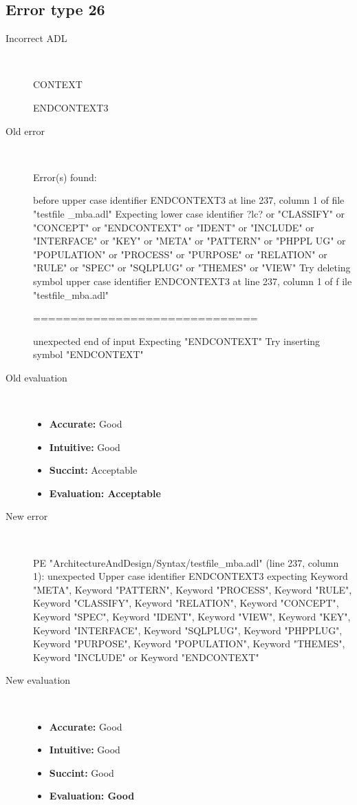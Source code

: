 \hrulefill

\subsection{Error type 26}
  \begin{description}
  \item[Incorrect ADL]~\\
\begin{adl}
CONTEXT

ENDCONTEXT3\end{adl}
  \item[Old error]~\\
\begin{haskell}
Error(s) found:

before upper case identifier ENDCONTEXT3 at line 237, column 1 of file "testfile
_mba.adl"
Expecting lower case identifier ?lc? or "CLASSIFY" or "CONCEPT" or "ENDCONTEXT"
or "IDENT" or "INCLUDE" or "INTERFACE" or "KEY" or "META" or "PATTERN" or "PHPPL
UG" or "POPULATION" or "PROCESS" or "PURPOSE" or "RELATION" or "RULE" or "SPEC"
or "SQLPLUG" or "THEMES" or "VIEW"
Try deleting symbol upper case identifier ENDCONTEXT3 at line 237, column 1 of f
ile "testfile_mba.adl"

==============================

unexpected end of input
Expecting "ENDCONTEXT"
Try inserting symbol "ENDCONTEXT"
\end{haskell}
  \item[Old evaluation]~\\
    \begin{itemize}
    \item \textbf{Accurate:} Good
    \item \textbf{Intuitive:} Good
    \item \textbf{Succint:} Acceptable
    \item \textbf{Evaluation: Acceptable}
    \end{itemize}
  \item[New error]~\\
\begin{haskell}
PE "ArchitectureAndDesign/Syntax/testfile_mba.adl" (line 237, column 1):
unexpected Upper case identifier ENDCONTEXT3
expecting Keyword "META", Keyword "PATTERN", Keyword "PROCESS", Keyword "RULE", Keyword "CLASSIFY", Keyword "RELATION", Keyword "CONCEPT", Keyword "SPEC", Keyword "IDENT", Keyword "VIEW", Keyword "KEY", Keyword "INTERFACE", Keyword "SQLPLUG", Keyword "PHPPLUG", Keyword "PURPOSE", Keyword "POPULATION", Keyword "THEMES", Keyword "INCLUDE" or Keyword "ENDCONTEXT"
\end{haskell}
  \item[New evaluation]~\\
    \begin{itemize}
    \item \textbf{Accurate:} Good
    \item \textbf{Intuitive:} Good
    \item \textbf{Succint:} Good
    \item \textbf{Evaluation: Good
}
    \end{itemize}
  \end{description}

